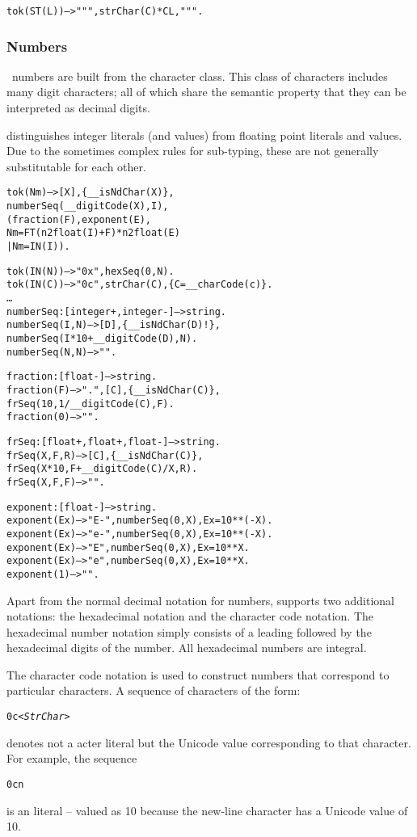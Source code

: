\begin{alltt}
tok(ST(L)) --> "\bsl{}"", strChar(C)*C\uphat{}L,"\bsl{}"".
\end{alltt}

\subsubsection{Numbers}
\label{token:number}

\go\ numbers are built from the  character class. This class of characters includes many digit characters; all of which share the semantic property that they can be interpreted as decimal digits.

\go distinguishes integer literals (and values) from floating point literals and values. Due to the sometimes complex rules for sub-typing, these are not generally substitutable for each other.

\begin{alltt}
tok(Nm) --> [X],\{__isNdChar(X)\},
    numberSeq(__digitCode(X),I),
    ( fraction(F),exponent(E),
      Nm = FT(n2float(I)+F)*n2float(E)
    | Nm = IN(I)).

tok(IN(N)) --> "0x", hexSeq(0,N).
tok(IN(C)) --> "0c", strChar(C), \{ C = __charCode(c)\}.
\dots
numberSeq:[integer+,integer-]-->string.
numberSeq(I,N) --> [D],\{\_\_isNdChar(D)!\},
        numberSeq(I*10+__digitCode(D),N).
numberSeq(N,N) --> "".

fraction:[float-]-->string.
fraction(F) --> ".", [C],\{\_\_isNdChar(C)\},
        frSeq(10,1/\_\_digitCode(C),F).
fraction(0) --> "".

frSeq:[float+,float+,float-]-->string.
frSeq(X,F,R) --> [C],\{\_\_isNdChar(C)\},
        frSeq(X*10,F+__digitCode(C)/X,R).
frSeq(X,F,F) --> "".

exponent:[float-]-->string.
exponent(Ex) --> "E-", numberSeq(0,X),Ex = 10 ** (-X).
exponent(Ex) --> "e-", numberSeq(0,X),Ex=10 ** (-X).
exponent(Ex) --> "E", numberSeq(0,X),Ex=10 ** X.
exponent(Ex) --> "e", numberSeq(0,X),Ex=10 ** X.
exponent(1) --> "".
\end{alltt}
Apart from the normal decimal notation for numbers, \go supports two additional notations: the hexadecimal notation and the character code notation. The hexadecimal number notation simply consists of a leading  followed by the hexadecimal digits of the number. All hexadecimal numbers are integral.

The character code notation is used to construct numbers that correspond to particular characters. A sequence of characters of the form:
\begin{alltt}
0c\emph{<StrChar>}
\end{alltt}
denotes not a acter literal but the Unicode value corresponding to that character. For example, the sequence
\begin{alltt}
0c\bsl{}n
\end{alltt}
is an  literal -- valued as 10 because the new-line character has a Unicode value of 10.

